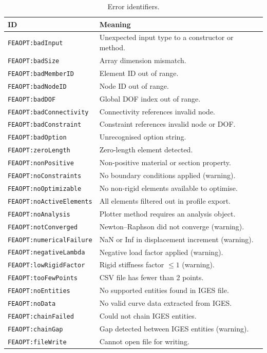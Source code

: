 \begin{table}[H]
\centering
\caption{Error identifiers.}
\label{tab:errors}
\begin{tabularx}{\textwidth}{lX}
\toprule
\textbf{ID} & \textbf{Meaning} \\
\midrule
\texttt{FEAOPT:badInput}         & Unexpected input type to a constructor or method. \\
\texttt{FEAOPT:badSize}          & Array dimension mismatch. \\
\texttt{FEAOPT:badMemberID}      & Element ID out of range. \\
\texttt{FEAOPT:badNodeID}        & Node ID out of range. \\
\texttt{FEAOPT:badDOF}           & Global DOF index out of range. \\
\texttt{FEAOPT:badConnectivity}  & Connectivity references invalid node. \\
\texttt{FEAOPT:badConstraint}    & Constraint references invalid node or DOF. \\
\texttt{FEAOPT:badOption}        & Unrecognised option string. \\
\texttt{FEAOPT:zeroLength}       & Zero-length element detected. \\
\texttt{FEAOPT:nonPositive}      & Non-positive material or section property. \\
\texttt{FEAOPT:noConstraints}    & No boundary conditions applied (warning). \\
\texttt{FEAOPT:noOptimizable}    & No non-rigid elements available to optimise. \\
\texttt{FEAOPT:noActiveElements} & All elements filtered out in profile export. \\
\texttt{FEAOPT:noAnalysis}       & Plotter method requires an analysis object. \\
\texttt{FEAOPT:notConverged}     & Newton--Raphson did not converge (warning). \\
\texttt{FEAOPT:numericalFailure} & NaN or Inf in displacement increment (warning). \\
\texttt{FEAOPT:negativeLambda}   & Negative load factor applied (warning). \\
\texttt{FEAOPT:lowRigidFactor}   & Rigid stiffness factor $\leq 1$ (warning). \\
\texttt{FEAOPT:tooFewPoints}     & CSV file has fewer than 2 points. \\
\texttt{FEAOPT:noEntities}       & No supported entities found in IGES file. \\
\texttt{FEAOPT:noData}           & No valid curve data extracted from IGES. \\
\texttt{FEAOPT:chainFailed}      & Could not chain IGES entities. \\
\texttt{FEAOPT:chainGap}         & Gap detected between IGES entities (warning). \\
\texttt{FEAOPT:fileWrite}        & Cannot open file for writing. \\
\bottomrule
\end{tabularx}
\end{table}